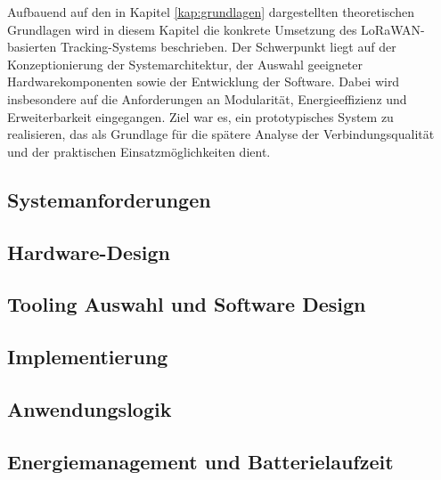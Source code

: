 Aufbauend auf den in Kapitel \ref{kap:grundlagen} dargestellten theoretischen Grundlagen wird in diesem Kapitel die konkrete Umsetzung des LoRaWAN-basierten Tracking-Systems beschrieben. Der Schwerpunkt liegt auf der Konzeptionierung der Systemarchitektur, der Auswahl geeigneter Hardwarekomponenten sowie der Entwicklung der Software. Dabei wird insbesondere auf die Anforderungen an Modularität, Energieeffizienz und Erweiterbarkeit eingegangen. Ziel war es, ein prototypisches System zu realisieren, das als Grundlage für die spätere Analyse der Verbindungsqualität und der praktischen Einsatzmöglichkeiten dient. 
\subsection{Systemanforderungen}

\subsection{Hardware-Design}

\subsection{Tooling Auswahl und Software Design}

\subsection{Implementierung}

\subsection{Anwendungslogik}

\subsection{Energiemanagement und Batterielaufzeit}
